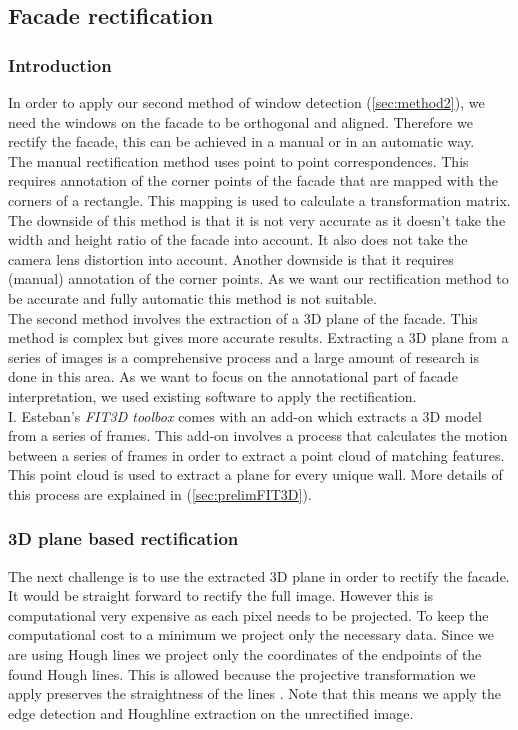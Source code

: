 \subsection{Facade rectification}
\subsubsection{Introduction}
In order to apply our second method of window detection (\ref{sec:method2}),
we need the windows on the facade to be orthogonal and aligned.
Therefore we rectify the facade, this can be achieved in a manual or in an automatic way.\\

The manual rectification method uses point to point correspondences. This 
requires annotation of the corner points of the facade that are mapped with the
corners of a rectangle. This mapping is used to calculate a transformation matrix. 
 The downside of this method is that it is not very accurate as it doesn't take
 the width and height ratio of the facade into account.
It also does not take the camera lens distortion into account.
 Another downside is that it requires (manual) annotation of the corner points.
As we want our rectification method to be accurate and fully automatic this
method is not suitable.\\

The second method involves the extraction of a 3D plane of the facade.  This
method is complex but gives more accurate results.  Extracting a 3D plane
from a series of images is a comprehensive process and a large amount of
research is done in this area.  As we want to focus on the annotational part of
facade interpretation, we used existing software to apply the rectification.\\

I. Esteban's \emph{FIT3D toolbox} \cite{FIT3D} comes with an add-on which
extracts a 3D model from a series of frames.  This add-on involves a process
that calculates the motion between a series of frames in order to extract a point
cloud of matching features. This point cloud is used to extract a plane for
every unique wall.  More details of this process are explained in
(\ref{sec:prelimFIT3D}).


\subsubsection{3D plane based rectification} 
The next challenge is to use the extracted 3D plane in order to rectify the facade.
It would be straight forward to rectify the full image. However this is
computational very expensive as each pixel needs to be projected. To keep the
computational cost to a minimum we project only the necessary data. Since we
are using Hough lines we project only the coordinates of the endpoints of the found Hough lines. 
This is allowed because the projective transformation we apply preserves the
straightness of the lines \cite{linearalgebra}. Note that this means we apply the edge detection and
Houghline extraction on the unrectified image.\\

